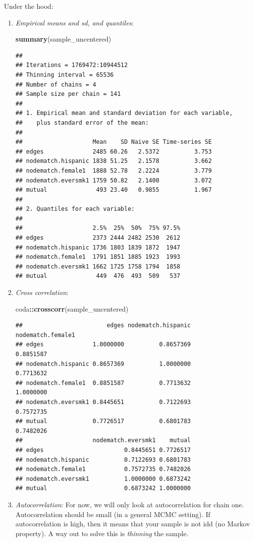 \documentclass[]{book}
\newenvironment{Shaded}{\begin{snugshade}}{\end{snugshade}}
\newcommand{\KeywordTok}[1]{\textcolor[rgb]{0.13,0.29,0.53}{\textbf{#1}}}
\newcommand{\NormalTok}[1]{#1}
\newcommand{\OperatorTok}[1]{\textcolor[rgb]{0.81,0.36,0.00}{\textbf{#1}}}
\begin{document}
Under the hood:

\begin{enumerate}
\def\labelenumi{\arabic{enumi}.}
\item
  \emph{Empirical means and sd, and quantiles}:

\begin{Shaded}
\begin{Highlighting}[]
\KeywordTok{summary}\NormalTok{(sample_uncentered)}
\end{Highlighting}
\end{Shaded}

\begin{verbatim}
## 
## Iterations = 1769472:10944512
## Thinning interval = 65536 
## Number of chains = 4 
## Sample size per chain = 141 
## 
## 1. Empirical mean and standard deviation for each variable,
##    plus standard error of the mean:
## 
##                    Mean    SD Naive SE Time-series SE
## edges              2485 60.26   2.5372          3.753
## nodematch.hispanic 1838 51.25   2.1578          3.662
## nodematch.female1  1888 52.78   2.2224          3.779
## nodematch.eversmk1 1759 50.82   2.1400          3.072
## mutual              493 23.40   0.9855          1.967
## 
## 2. Quantiles for each variable:
## 
##                    2.5%  25%  50%  75% 97.5%
## edges              2373 2444 2482 2530  2612
## nodematch.hispanic 1736 1803 1839 1872  1947
## nodematch.female1  1791 1851 1885 1923  1993
## nodematch.eversmk1 1662 1725 1758 1794  1858
## mutual              449  476  493  509   537
\end{verbatim}
\item
  \emph{Cross correlation}:

\begin{Shaded}
\begin{Highlighting}[]
\NormalTok{coda}\OperatorTok{::}\KeywordTok{crosscorr}\NormalTok{(sample_uncentered)}
\end{Highlighting}
\end{Shaded}

\begin{verbatim}
##                        edges nodematch.hispanic nodematch.female1
## edges              1.0000000          0.8657369         0.8851587
## nodematch.hispanic 0.8657369          1.0000000         0.7713632
## nodematch.female1  0.8851587          0.7713632         1.0000000
## nodematch.eversmk1 0.8445651          0.7122693         0.7572735
## mutual             0.7726517          0.6801783         0.7482026
##                    nodematch.eversmk1    mutual
## edges                       0.8445651 0.7726517
## nodematch.hispanic          0.7122693 0.6801783
## nodematch.female1           0.7572735 0.7482026
## nodematch.eversmk1          1.0000000 0.6873242
## mutual                      0.6873242 1.0000000
\end{verbatim}
\item
  \emph{Autocorrelation}: For now, we will only look at autocorrelation for chain one. Autocorrelation should be small (in a general MCMC setting). If autocorrelation is high, then it means that your sample is not idd (no Markov property). A way out to solve this is \emph{thinning} the sample.


\end{enumerate}
\end{document}
